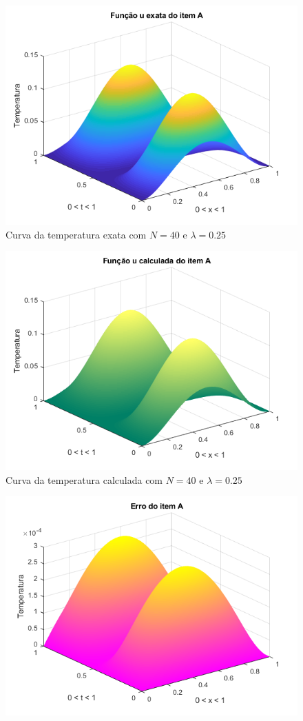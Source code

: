 \documentclass[12pt]{article}
\begin{document}
\begin{spacing}{1.5}
\begin{figure}
    \centering
    \includegraphics[width=0.8\linewidth]{Primeira_Tarefa/ItemA/n40_lambda0-25_exata.png}
    \caption{Curva da temperatura exata com $N=40$ e $\lambda=0.25$}
    \label{fig:A_n40lambda0-25_exata}
\end{figure}
\begin{figure}
    \centering
    \includegraphics[width=0.8\linewidth]{Primeira_Tarefa/ItemA/n40_lambda0-25_calc.png}
    \caption{Curva da temperatura calculada com $N=40$ e $\lambda=0.25$}
    \label{fig:A_n40lambda0-25_calc}
\end{figure}
\begin{figure}
    \centering
    \includegraphics[width=0.8\linewidth]{Primeira_Tarefa/ItemA/n40_lambda0-25_erro.png}

\end{figure}
\end{spacing}
\end{document}
